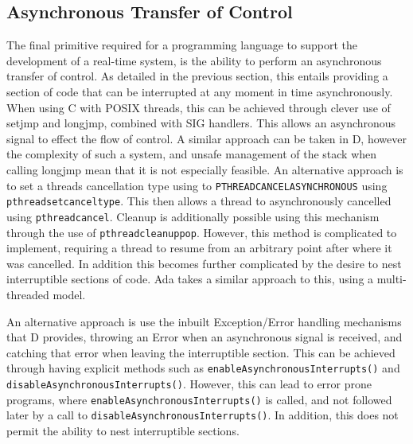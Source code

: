 \subsection{Asynchronous Transfer of Control}
The final primitive required for a programming language to support the development 
of a real-time system, is the ability to perform an asynchronous transfer of 
control. As detailed in the previous section, this entails providing a 
section of code that can be interrupted at any moment in time asynchronously. 
When using C with POSIX threads, this can be achieved through clever use of 
setjmp and longjmp, combined with SIG handlers. This allows an asynchronous 
signal to effect the flow of control. A similar approach can be taken in D, 
however the complexity of such a system, and unsafe management of the stack when 
calling longjmp 
\cite{c2.com/cgi/wiki?UnwindingTheStack} mean that it is not especially feasible. 
An alternative approach is to set a threads cancellation type using to 
\texttt{PTHREAD\textunderscore{}CANCEL\textunderscore{}ASYNCHRONOUS} using 
\texttt{pthread\textunderscore{}setcanceltype}. This then allows a thread to 
asynchronously cancelled using \texttt{pthread\textunderscore{}cancel}. Cleanup 
is additionally possible using this mechanism through the use of 
\texttt{pthread\textunderscore{}cleanup\textunderscore{}pop}. However, 
this method is complicated to implement, requiring a thread to resume from an 
arbitrary point after where it was cancelled. In addition this becomes further 
complicated by the desire to nest interruptible sections of code. 
Ada takes a similar approach to this, using a multi-threaded model. 

An alternative approach is use the inbuilt Exception/Error handling mechanisms 
that D provides, throwing an Error when an asynchronous signal is received, and 
catching that error when leaving the interruptible section. This can be 
achieved through having explicit methods such as \texttt{enableAsynchronousInterrupts()}
and \texttt{disableAsynchronousInterrupts()}. However, this can lead to error 
prone programs, where \texttt{enableAsynchronousInterrupts()} is called, and not 
followed later by a call to \texttt{disableAsynchronousInterrupts()}. 
In addition, this does not permit the ability to nest interruptible sections. 



